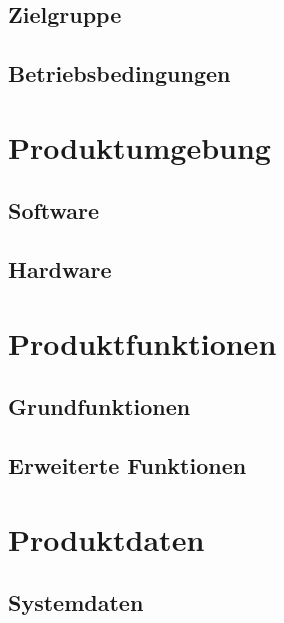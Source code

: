 \documentclass[oneside, ngerman]{sdqtechreport}
\begin{document}
\section{Zielgruppe}
\label{sec:Produkteinsatz:Zielgruppe}

\section{Betriebsbedingungen}
\label{sec:Produkteinsatz:Betriebsbedingungen}



\chapter{Produktumgebung}
\label{chap:Produktumgebung}

\section{Software}
\label{sec:Produktumgebung:Software}

\section{Hardware}
\label{sec:Produktumgebung:Hardware}



\chapter{Produktfunktionen}
\label{chap:Produktfunktionen}

\section{Grundfunktionen}
\label{sec:Produktfunktionen:Software}

\section{Erweiterte Funktionen}
\label{sec:Produktfunktionen:Hardware}



\chapter{Produktdaten}
\label{chap:Produktdaten}

\section{Systemdaten}
\label{sec:Produktdaten:Systemdaten}
\end{document}
